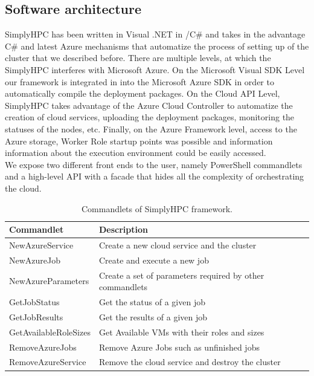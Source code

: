 \documentclass[3p,times]{elsarticle}
\begin{document}
\subsection{Software architecture}

SimplyHPC has been written in Visual .NET in /C\# and takes in the advantage C\# and latest Azure mechanisms that automatize the process of setting up of the cluster that we described before. There are multiple levels, at which the SimplyHPC interferes with Microsoft Azure. On the Microsoft Visual SDK Level our framework is integrated in into the Microsoft Azure SDK in order to automatically compile the deployment packages. On the Cloud API Level, SimplyHPC takes advantage of the Azure Cloud Controller to automatize the creation of cloud services, uploading the  deployment packages, monitoring the statuses of the nodes, etc. Finally, on the Azure Framework level, access to the Azure storage, Worker Role startup points was possible and information information about the execution environment could be easily accessed.\\
We expose two different front ends to the user, namely PowerShell commandlets and a high-level API with a facade that hides all the complexity of orchestrating the cloud. 

\begin{table}
	\centering		
		\begin{tabular}{|l|l|}
		\hline
      \textbf{Commandlet} & \textbf{Description} \\ \hline
      NewAzureService & Create a new cloud service and the cluster \\ \hline
			NewAzureJob & Create and execute a new job \\ \hline
			NewAzureParameters & Create a set of parameters required by other commandlets    \\ \hline
			GetJobStatus & Get the status of a given job    \\ \hline
			GetJobResults & Get the results of a given job  \\ \hline
			GetAvailableRoleSizes & Get Available VMs with their roles and sizes \\ \hline
			RemoveAzureJobs & Remove Azure Jobs such as unfinished jobs \\ \hline
			RemoveAzureService & Remove the cloud service and destroy the cluster \\ \hline
    \end{tabular}
	\caption{Commandlets of SimplyHPC framework.}
	\label{tab:CommandletsOfSimplyHPC}
\end{table}
\end{document}
